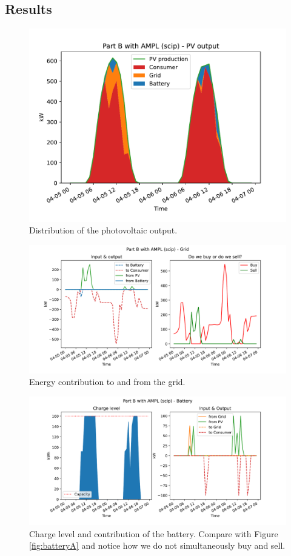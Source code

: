 \documentclass[12pt]{article}
\begin{document}
\subsection{Results}
\begin{figure}[p]
    \centering
    \includegraphics[width=\textwidth]{figs/PartB/pv_output}
    \caption{Distribution of the photovoltaic output.}
\end{figure}

\begin{figure}[p]
    \centering
    \includegraphics[width=\textwidth]{figs/PartB/grid}
    \caption{Energy contribution to and from the grid.}
\end{figure}

\begin{figure}[p]
    \centering
    \includegraphics[width=\textwidth]{figs/PartB/battery}
    \caption{Charge level and contribution of the battery. Compare with Figure \ref{fig:batteryA} and notice how we do not simultaneously buy and sell.}
    \label{fig:batteryB}
\end{figure}
\end{document}
